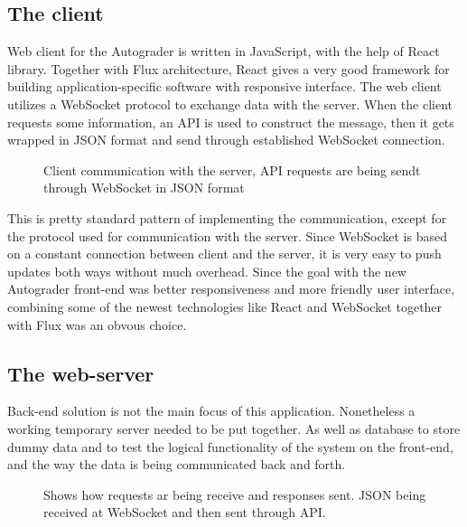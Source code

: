 \subsection{The client}
Web client for the Autograder is written in JavaScript, with the help of React library. Together with Flux architecture, React gives a very good framework for building application-specific software with responsive interface. The web client utilizes a WebSocket protocol to exchange data with the server. When the client requests some information, an API is used to construct the message, then it gets wrapped in JSON format and send through established WebSocket connection.
\begin{figure}[h]
  \scalebox{1}{}
  \caption{Client communication with the server, API requests are being sendt through WebSocket in JSON format}
  \label{fig:clientoverview}
\end{figure}
This is pretty standard pattern of implementing the communication, except for the protocol used for communication with the server. Since WebSocket is based on a constant connection between client and the server, it is very easy to push updates both ways without much overhead. Since the goal with the new Autograder front-end was better responsiveness and more friendly user interface, combining some of the newest technologies like React and WebSocket together with Flux was an obvous choice.

\subsection{The web-server}

Back-end solution is not the main focus of this application. Nonetheless a working temporary server needed to be put together. As well as database to store dummy data and to test the logical functionality of the system on the front-end, and the way the data is being communicated back and forth.
\begin{figure}[h]
  \scalebox{1}{}
  \caption{Shows how requests ar being receive and responses sent. JSON being received at WebSocket and then sent through API.}
  \label{fig:serveroverview}
\end{figure}


